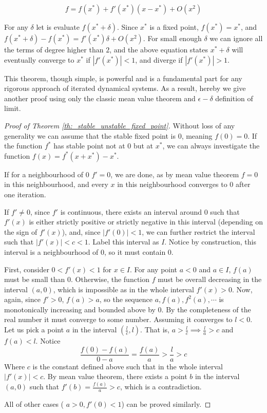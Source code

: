 $$f = f(x^*) + f'(x^*) (x - x^*) + O(x^2)$$

For any $\delta$ let is evaluate $f(x^* + \delta)$.
Since $x^*$ is a fixed point,
 $f(x^*) = x^*$, and
 $f(x^* + \delta) - f(x^*) = f'(x^*) \delta + O(x^2)$. 
For small enough $\delta$ we can ignore all the terms of degree higher than $2$, and the above equation states $x^*+ \delta$ will eventually converge to $x^*$ if $|f'(x^*)| < 1$, and diverge if $|f'(x^*)| > 1$.

This theorem, though simple, is powerful and is a fundamental part for any rigorous approach of iterated dynamical systems. 
As a result, hereby we give another proof using only the classic mean value theorem and $\epsilon-\delta$ definition of limit.

\begin{proof}[Proof of Theorem \ref{th:_stable_unstable_fixed_point}]
	Without loss of any generality we can assume that the stable fixed point is $0$, meaning $f(0) = 0$. 
	If the function $f^*$ has stable point not at $0$ but at $x^*$, we can always investigate the function $f(x) = f^*(x+x^*) - x^*$. 
	
	If for a neighbourhood of $0$ $f' = 0$, we are done, as by mean value theorem $f = 0$ in this neighbourhood, and every $x$ in this neighbourhood converges to $0$ after one iteration.

	If $f' \neq 0$, since $f'$ is continuous, there exists an interval around $0$ such that $f'(x)$ is either strictly positive or strictly negative in this interval (depending on the sign of $f'(x)$), and, since $|f'(0)| < 1$, we can further restrict the interval such that $|f'(x)| < c < 1$. 
	Label this interval as $I$. 
	Notice by construction, this interval is a neighbourhood of $0$, so it must contain $0$.
	
	First, consider $0 < f'(x) < 1$ for $x \in I$. 
	For any point $a<0$ and $a\in I$,  $f(a)$ must be small than $0$. 
	Otherwise, the function $f$ must be overall decreasing in the interval $(a, 0)$, which is impossible as in the whole interval $f'(x) > 0$. 
	Now, again, since $f'> 0$, $f(a) > a$, so the sequence $a, f(a), f^2(a), \cdots$ is monotonically increasing and bounded above by $0$. 
	By the completeness of the real number it must converge to some number. 
	Assuming it converges to $l < 0$. 
	Let us pick a point $a$ in the interval $(\frac{l}{c}, l)$. 
	That is, $a > \frac{l}{c} \implies \frac{l}{a} > c$ and $f(a) < l$.
	Notice 
	$$
	\frac{f(0) - f(a)}{0 - a} = \frac{f(a)}{a} > \frac{l}{a} > c
	$$
	Where $c$ is the constant defined above such that in the whole interval $|f'(x)| < c$.
	By mean value theorem, there exists a point $b$ in the interval $(a, 0)$ such that $f'(b) = \frac{f(a)}{a} > c$, which is a contradiction.

	All of other cases ( $a > 0, f'(0) < 1$) can be proved similarly.
\end{proof}

